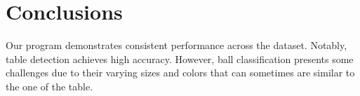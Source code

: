 \section{Conclusions}
Our program demonstrates consistent performance across the dataset. Notably, table detection achieves high accuracy. However, ball classification presents some challenges due to their varying sizes and colors that can sometimes are similar to the one of the table.
